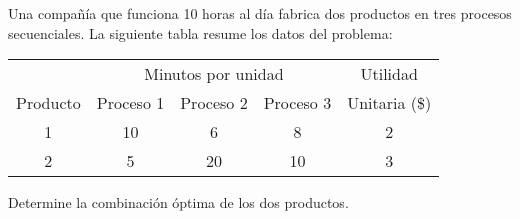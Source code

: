 \begin{frameact}{}{}
  Una compañía que funciona 10 horas al día fabrica dos productos en tres procesos secuenciales. La siguiente tabla resume los datos del problema:

  {
    \centering
    \begin{tabular}{ccccc}
      \toprule
      &\multicolumn{3}{c}{Minutos por unidad}&Utilidad\\
      \cmidrule{2-4}
      Producto& Proceso 1& Proceso 2& Proceso 3& Unitaria (\$)\\
      \midrule
1&10&6&8&2\\
      2&5&20&10&3\\
      \bottomrule
    \end{tabular}
    \par
  }
  
  Determine la combinación óptima de los dos productos.
\end{frameact}


